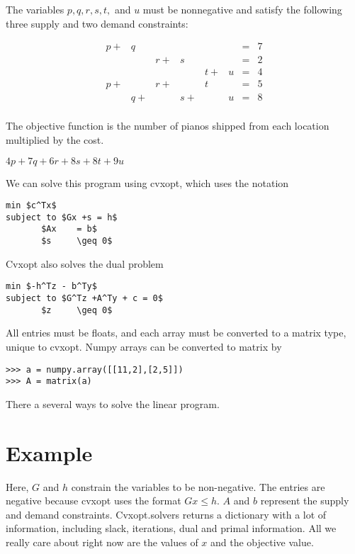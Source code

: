 The variables $p,q,r,s,t,$ and $u$ must be nonnegative and satisfy the following three supply and two demand constraints:

\begin{align}
p +& q  &    &    &    &   &=& 7\\
   &    & r +& s  &    &   &=& 2\\
   &    &    &    & t +& u &=& 4\\
p +&    & r +&    & t  &   &=& 5\\
   & q +&    & s +&    & u &=& 8\\
\end{align}

The objective function is the number of pianos shipped from each location multiplied by the cost.

\begin{center}
$4p + 7q + 6r + 8s + 8t + 9u$
\end{center}

We can solve this program using cvxopt, which uses the notation

\begin{lstlisting}[mathescape]
min $c^Tx$
subject to $Gx +s = h$
	   $Ax    = b$
	   $s     \geq 0$
\end{lstlisting}

Cvxopt also solves the dual problem

\begin{lstlisting}[mathescape]
min $-h^Tz - b^Ty$
subject to $G^Tz +A^Ty + c = 0$
	   $z     \geq 0$
\end{lstlisting}

All entries must be floats, and each array must be converted to a matrix type, unique to cvxopt. Numpy arrays can be converted to matrix by

\begin{lstlisting}
>>> a = numpy.array([[11,2],[2,5]])
>>> A = matrix(a)
\end{lstlisting}

There a several ways to solve the linear program. 



\section*{Example}
Here, $G$ and $h$ constrain the variables to be non-negative. The entries are negative because cvxopt uses the format $Gx \leq h$. $A$ and $b$ represent the supply and demand constraints. Cvxopt.solvers returns a dictionary with a lot of information, including slack, iterations, dual and primal information. All we really care about right now are the values of $x$ and the objective value.

